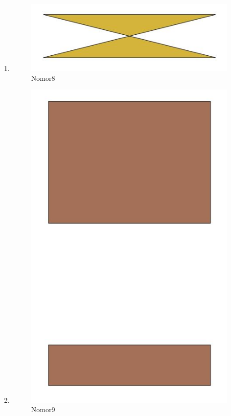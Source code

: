 \begin{enumerate}
			\item 
				
				\begin{figure}[H]
					\includegraphics[width=12cm]{figures/1174043/8.jpg}
					\centering
					\caption{Nomor8}
				\end{figure}
			
			\item 
				
				\begin{figure}[H]
					\includegraphics[width=12cm]{figures/1174043/9.jpg}
					\centering
					\caption{Nomor9}
				\end{figure}
			

\end{enumerate}
